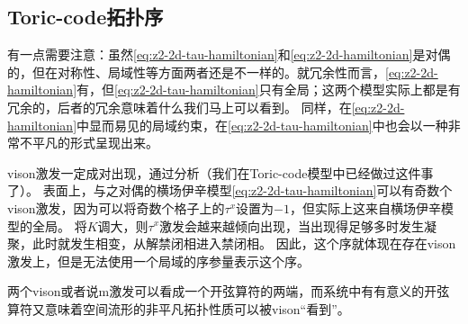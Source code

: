 \subsection{Toric-code拓扑序}\label{sec:z2-topo-excitation}

有一点需要注意：虽然\eqref{eq:z2-2d-tau-hamiltonian}和\eqref{eq:z2-2d-hamiltonian}是对偶的，但在对称性、局域性等方面两者还是不一样的。就冗余性而言，\eqref{eq:z2-2d-hamiltonian}有，但\eqref{eq:z2-2d-tau-hamiltonian}只有全局；这两个模型实际上都是有冗余的，后者的冗余意味着什么我们马上可以看到。
同样，在\eqref{eq:z2-2d-hamiltonian}中显而易见的局域约束，在\eqref{eq:z2-2d-tau-hamiltonian}中也会以一种非常不平凡的形式呈现出来。



vison激发一定成对出现，通过分析（我们在Toric-code模型中已经做过这件事了）。
表面上，与之对偶的横场伊辛模型\eqref{eq:z2-2d-tau-hamiltonian}可以有奇数个vison激发，因为可以将奇数个格子上的$\tau^x$设置为$-1$，但实际上这来自横场伊辛模型的全局。
将$K$调大，则$\tau^x$激发会越来越倾向出现，当出现得足够多时发生凝聚，此时就发生相变，从解禁闭相进入禁闭相。
因此，这个序就体现在存在vison激发上，但是无法使用一个局域的序参量表示这个序。

两个vison或者说m激发可以看成一个开弦算符的两端，而系统中有有意义的开弦算符又意味着空间流形的非平凡拓扑性质可以被vison“看到”。

